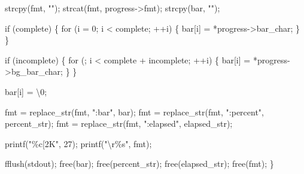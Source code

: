 \documentclass[
  a4paper,
]{scrreprt}
\newenvironment{Shaded}{\begin{snugshade}}{\end{snugshade}}
\newcommand{\CharTok}[1]{\textcolor[rgb]{0.00,0.50,0.00}{#1}}
\newcommand{\ControlFlowTok}[1]{\textcolor[rgb]{0.85,0.12,0.09}{#1}}
\newcommand{\DecValTok}[1]{\textcolor[rgb]{0.47,0.16,0.63}{#1}}
\newcommand{\NormalTok}[1]{\textcolor[rgb]{0.33,0.33,0.33}{#1}}
\newcommand{\OperatorTok}[1]{\textcolor[rgb]{0.00,0.46,0.62}{#1}}
\newcommand{\SpecialCharTok}[1]{\textcolor[rgb]{0.00,0.46,0.62}{#1}}
\newcommand{\StringTok}[1]{\textcolor[rgb]{0.00,0.50,0.00}{#1}}
\theoremstyle{definition}
\theoremstyle{remark}
\begin{document}
\begin{Shaded}
\begin{Highlighting}[numbers=left,,]
\NormalTok{  strcpy}\OperatorTok{(}\NormalTok{fmt}\OperatorTok{,} \StringTok{""}\OperatorTok{);}
\NormalTok{  strcat}\OperatorTok{(}\NormalTok{fmt}\OperatorTok{,}\NormalTok{ progress}\OperatorTok{{-}\textgreater{}}\NormalTok{fmt}\OperatorTok{);}
\NormalTok{  strcpy}\OperatorTok{(}\NormalTok{bar}\OperatorTok{,} \StringTok{""}\OperatorTok{);}

  \ControlFlowTok{if} \OperatorTok{(}\NormalTok{complete}\OperatorTok{)} \OperatorTok{\{}
    \ControlFlowTok{for} \OperatorTok{(}\NormalTok{i }\OperatorTok{=} \DecValTok{0}\OperatorTok{;}\NormalTok{ i }\OperatorTok{\textless{}}\NormalTok{ complete}\OperatorTok{;} \OperatorTok{++}\NormalTok{i}\OperatorTok{)} \OperatorTok{\{}
\NormalTok{      bar}\OperatorTok{[}\NormalTok{i}\OperatorTok{]} \OperatorTok{=} \OperatorTok{*}\NormalTok{progress}\OperatorTok{{-}\textgreater{}}\NormalTok{bar\_char}\OperatorTok{;}
    \OperatorTok{\}}
  \OperatorTok{\}}

  \ControlFlowTok{if} \OperatorTok{(}\NormalTok{incomplete}\OperatorTok{)} \OperatorTok{\{}
    \ControlFlowTok{for} \OperatorTok{(;}\NormalTok{ i }\OperatorTok{\textless{}}\NormalTok{ complete }\OperatorTok{+}\NormalTok{ incomplete}\OperatorTok{;} \OperatorTok{++}\NormalTok{i}\OperatorTok{)} \OperatorTok{\{}
\NormalTok{       bar}\OperatorTok{[}\NormalTok{i}\OperatorTok{]} \OperatorTok{=} \OperatorTok{*}\NormalTok{progress}\OperatorTok{{-}\textgreater{}}\NormalTok{bg\_bar\_char}\OperatorTok{;}
    \OperatorTok{\}}
  \OperatorTok{\}}

\NormalTok{  bar}\OperatorTok{[}\NormalTok{i}\OperatorTok{]} \OperatorTok{=} \CharTok{\textquotesingle{}}\SpecialCharTok{\textbackslash{}0}\CharTok{\textquotesingle{}}\OperatorTok{;}

\NormalTok{  fmt }\OperatorTok{=}\NormalTok{ replace\_str}\OperatorTok{(}\NormalTok{fmt}\OperatorTok{,} \StringTok{":bar"}\OperatorTok{,}\NormalTok{ bar}\OperatorTok{);}
\NormalTok{  fmt }\OperatorTok{=}\NormalTok{ replace\_str}\OperatorTok{(}\NormalTok{fmt}\OperatorTok{,} \StringTok{":percent"}\OperatorTok{,}\NormalTok{ percent\_str}\OperatorTok{);}
\NormalTok{  fmt }\OperatorTok{=}\NormalTok{ replace\_str}\OperatorTok{(}\NormalTok{fmt}\OperatorTok{,} \StringTok{":elapsed"}\OperatorTok{,}\NormalTok{ elapsed\_str}\OperatorTok{);}

\NormalTok{  printf}\OperatorTok{(}\StringTok{"}\SpecialCharTok{\%c}\StringTok{[2K"}\OperatorTok{,} \DecValTok{27}\OperatorTok{);}
\NormalTok{  printf}\OperatorTok{(}\StringTok{"}\SpecialCharTok{\textbackslash{}r\%s}\StringTok{"}\OperatorTok{,}\NormalTok{ fmt}\OperatorTok{);}

\NormalTok{  fflush}\OperatorTok{(}\NormalTok{stdout}\OperatorTok{);}
\NormalTok{  free}\OperatorTok{(}\NormalTok{bar}\OperatorTok{);}
\NormalTok{  free}\OperatorTok{(}\NormalTok{percent\_str}\OperatorTok{);}
\NormalTok{  free}\OperatorTok{(}\NormalTok{elapsed\_str}\OperatorTok{);}
\NormalTok{  free}\OperatorTok{(}\NormalTok{fmt}\OperatorTok{);}
\OperatorTok{\}}
\end{Highlighting}
\end{Shaded}
\end{document}
